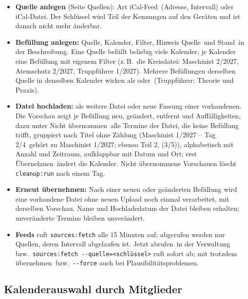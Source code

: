 \documentclass[a4paper,fontsize=10pt]{scrartcl}
\newcommand{\code}[1]{\texttt{#1}}
\begin{document}
\begin{itemize}
  \item \textbf{Quelle anlegen} (Seite \glqq Quellen\grqq): Art
        \glqq iCal-Feed\grqq\ (Adresse, Intervall) oder \glqq iCal-Datei\grqq.
        Der Schlüssel wird Teil der Kennungen auf den Geräten und ist danach
        nicht mehr änderbar.
  \item \textbf{Befüllung anlegen:} Quelle, Kalender, Filter, Hinweis
        \glqq Quelle\grqq\ und \glqq Stand\grqq\ in der Beschreibung. Eine
        Quelle befüllt beliebig viele Kalender, je Kalender eine Befüllung
        mit eigenem Filter (z.\,B.\ die Kreisdatei: \glqq Maschinist
        2/2027\grqq, \glqq Atemschutz 2/2027\grqq, \glqq Truppführer
        1/2027\grqq). Mehrere Befüllungen derselben Quelle in denselben
        Kalender wirken als \glqq oder\grqq\ (Truppführer: Theorie und
        Praxis).
  \item \textbf{Datei hochladen:} als weitere Datei oder neue Fassung einer
        vorhandenen. Die Vorschau zeigt je Befüllung neu, geändert, entfernt
        und Auffälligkeiten, dazu unter \glqq Nicht übernommen\grqq\ alle
        Termine der Datei, die keine Befüllung trifft, gruppiert nach Titel
        ohne Zählung (\glqq Maschinist 1/2027 -- Tag 2/4\grqq\ gehört zu
        \glqq Maschinist 1/2027\grqq; ebenso \glqq Teil 2\grqq, \glqq (3/5)\grqq),
        alphabetisch mit Anzahl und Zeitraum, aufklappbar mit Datum und Ort;
        erst \glqq
        Übernehmen\grqq\ ändert die Kalender. Nicht übernommene Vorschauen
        löscht \code{cleanup:run} nach einem Tag.
  \item \textbf{Erneut übernehmen:} Nach einer neuen oder geänderten
        Befüllung wird eine vorhandene Datei ohne neuen Upload noch einmal
        verarbeitet, mit derselben Vorschau. Name und Hochladedatum der Datei
        bleiben erhalten; unveränderte Termine bleiben unverändert.
  \item \textbf{Feeds} ruft \code{sources:fetch} alle 15 Minuten auf; abgerufen
        werden nur Quellen, deren Intervall abgelaufen ist. \glqq Jetzt
        abrufen\grqq\ in der Verwaltung bzw.\ \code{sources:fetch -{}-quelle=<schlüssel>}
        ruft sofort ab; mit \glqq trotzdem übernehmen\grqq\ bzw.\
        \code{-{}-force} auch bei Plausibilitätsproblemen.
\end{itemize}

\subsection{Kalenderauswahl durch Mitglieder}
\end{document}

